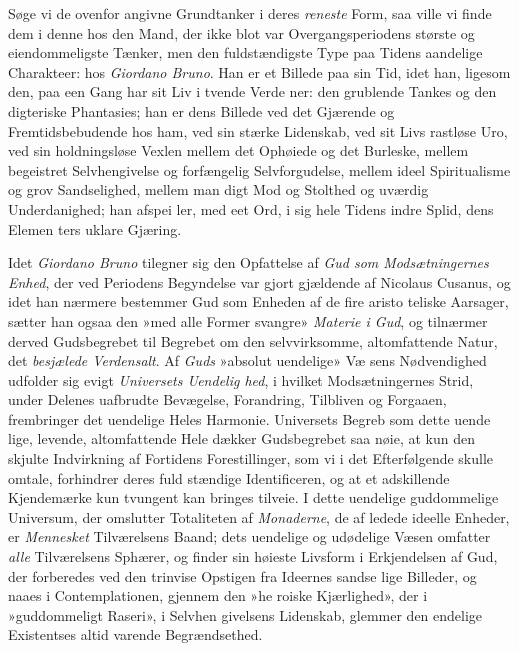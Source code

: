 Søge vi de ovenfor angivne Grundtanker i deres \emph{reneste}
Form, saa ville vi finde dem i denne hos den Mand, der ikke
blot var Overgangsperiodens største og eiendommeligste Tænker,
men den fuldstændigste Type paa Tidens aandelige Charakteer:
 hos \emph{Giordano Bruno}. Han er et Billede paa sin Tid, idet
han, ligesom den, paa een Gang har sit Liv i tvende Verde\-%
ner: den grublende Tankes og den digteriske Phantasies; han
er dens Billede ved det Gjærende og Fremtidsbebudende hos
ham, ved sin stærke Lidenskab, ved sit Livs rastløse Uro, ved
sin holdningsløse Vexlen mellem det Ophøiede og det Burleske,
mellem begeistret Selvhengivelse og forfængelig Selvforgudelse,
mellem ideel Spiritualisme og grov Sandselighed, mellem man\-%
digt Mod og Stolthed og uværdig Underdanighed; han afspei\-%
ler, med eet Ord, i sig hele Tidens indre Splid, dens Elemen\-%
ters uklare Gjæring.

Idet \emph{Giordano Bruno} tilegner sig den Opfattelse af
\emph{Gud som Modsætningernes Enhed}, der ved Periodens
Begyndelse var gjort gjældende af Nicolaus Cusanus, og idet
han nærmere bestemmer Gud som Enheden af de fire aristo\-%
teliske Aarsager, sætter han ogsaa den »med alle Former
svangre» \emph{Materie i Gud}, og tilnærmer derved Gudsbegrebet
til Begrebet om den selvvirksomme, altomfattende Natur, det
\emph{besjælede Verdensalt}. Af \emph{Guds} »absolut uendelige» Væ\-%
sens Nødvendighed udfolder sig evigt \emph{Universets Uendelig\-%
hed}, i hvilket Modsætningernes Strid, under Delenes uafbrudte
Bevægelse, Forandring, Tilbliven og Forgaaen, frembringer det
uendelige Heles Harmonie. Universets Begreb som dette uende\-%
lige, levende, altomfattende Hele dækker Gudsbegrebet saa
nøie, at kun den skjulte Indvirkning af Fortidens Forestillinger,
som vi i det Efterfølgende skulle omtale, forhindrer deres fuld\-%
stændige Identificeren, og at et adskillende Kjendemærke kun
tvungent kan bringes tilveie. I dette uendelige guddommelige
Universum, der omslutter Totaliteten af \emph{Monaderne}, de af\-%
ledede ideelle Enheder, er \emph{Mennesket} Tilværelsens Baand;
dets uendelige og udødelige Væsen omfatter \emph{alle} Tilværelsens
Sphærer, og finder sin høieste Livsform i Erkjendelsen af Gud,
der forberedes ved den trinvise Opstigen fra Ideernes sandse\-%
lige Billeder, og naaes i Contemplationen, gjennem den »he\-%
roiske Kjærlighed», der i »guddommeligt Raseri», i Selvhen\-%
givelsens Lidenskab, glemmer den endelige Existentses altid
varende Begrændsethed.

